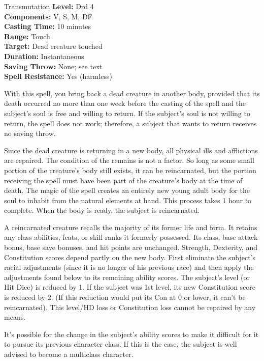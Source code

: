 {Transmutation}
{
	\textbf{Level:}
	Drd 4\\
	\textbf{Components:}
	V, S, M, DF\\
	\textbf{Casting Time:}
	10 minutes\\
	\textbf{Range:}
	Touch\\
	\textbf{Target:}
	Dead creature touched\\
	\textbf{Duration:}
	Instantaneous\\
	\textbf{Saving Throw:}
	None; see text\\
	\textbf{Spell Resistance:}
	Yes (harmless)\\
}
{
	With this spell, you bring back a dead creature in another body, provided that its death occurred no more than one week before the casting of the spell and the subject's soul is free and willing to return. If the subject's soul is not willing to return, the spell does not work; therefore, a subject that wants to return receives no saving throw.

	Since the dead creature is returning in a new body, all physical ills and afflictions are repaired. The condition of the remains is not a factor. So long as some small portion of the creature's body still exists, it can be reincarnated, but the portion receiving the spell must have been part of the creature's body at the time of death. The magic of the spell creates an entirely new young adult body for the soul to inhabit from the natural elements at hand. This process takes 1 hour to complete.  When the body is ready, the subject is reincarnated.

	A reincarnated creature recalls the majority of its former life and form. It retains any class abilities, feats, or skill ranks it formerly possessed. Its class, base attack bonus, base save bonuses, and hit points are unchanged. Strength, Dexterity, and Constitution scores depend partly on the new body. First eliminate the subject's racial adjustments (since it is no longer of his previous race) and then apply the adjustments found below to its remaining ability scores. The subject's level (or Hit Dice) is reduced by 1. If the subject was 1st level, its new Constitution score is reduced by 2. (If this reduction would put its Con at 0 or lower, it can't be reincarnated). This level/HD loss or Constitution loss cannot be repaired by any means.

	It's possible for the change in the subject's ability scores to make it difficult for it to pursue its previous character class. If this is the case, the subject is well advised to become a multiclass character.

}

